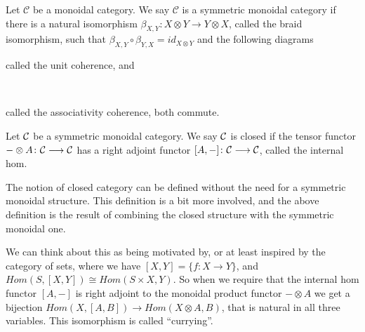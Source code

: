 \begin{definition}
Let $ \mathcal{C}$ be a monoidal category. We say  $ \mathcal{C}$ is a symmetric monoidal category if there is a natural isomorphism $ \beta_{X,Y}: X\otimes Y \rightarrow Y \otimes X$, called the braid isomorphism, such that $ \beta_{X,Y}\circ \beta_{Y,X} = id_{X\otimes Y} $ and the following diagrams 
\begin{center}
\end{center}
called the unit coherence, and
\begin{center}
\
\end{center}
called the associativity coherence, both commute. 
\end{definition}

\begin{definition}
Let $\mathcal{C}$ be a symmetric monoidal category. We say $\mathcal{C}$ is closed if the tensor functor $-\otimes A\colon \mathcal{C} \longrightarrow \mathcal{C}$ has a right adjoint functor $[A, -]\colon \mathcal{C} \longrightarrow \mathcal{C}$, called the internal hom. 
\end{definition}

The notion of closed category can be defined without the need for a symmetric monoidal structure. This definition is a bit more involved, and the above definition is the result of combining the closed structure with the symmetric monoidal one. 

We can think about this as being motivated by, or at least inspired by the category of sets, where we have $[X,Y]=\{ f:X\rightarrow Y\}$, and $Hom(S, [X, Y])\cong Hom(S\times X, Y)$. So when we require that the internal hom functor $[A,-]$ is right adjoint to the monoidal product functor $-\otimes A$ we get a bijection $Hom(X, [A, B])\rightarrow Hom(X\otimes A, B)$, that is natural in all three variables. This isomorphism is called ``currying''.

